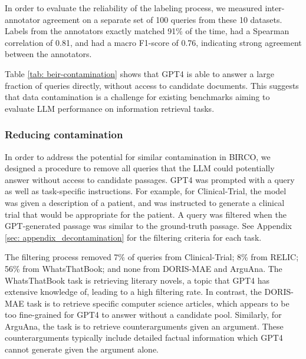 \documentclass[11pt]{article}
\begin{document}
In order to evaluate the reliability of the labeling process, we measured inter-annotator agreement on a separate set of 100 queries from these 10 datasets. Labels from the annotators exactly matched 91\% of the time, had a Spearman correlation of 0.81, and had a macro F1-score of 0.76, indicating strong agreement between the annotators.
  

Table \ref{tab: beir-contamination} shows that GPT4 is able to answer a large fraction of queries directly, without access to candidate documents. This suggests that data contamination is a challenge for existing benchmarks aiming to evaluate LLM performance on information retrieval tasks.


\subsubsection{Reducing contamination}

In order to address the potential for similar contamination in BIRCO, we designed a procedure to remove all queries that the LLM could potentially answer without access to candidate passages. GPT4 was prompted with a query as well as task-specific instructions. For example, for Clinical-Trial, the model was given a description of a patient, and was instructed to generate a clinical trial that would be appropriate for the patient. A query was filtered when the GPT-generated passage was similar to the ground-truth passage. See Appendix \ref{sec: appendix_decontamination} for the filtering criteria for each task.


The filtering process removed 7\% of queries from Clinical-Trial; 8\% from RELIC; 56\% from WhatsThatBook; and none from DORIS-MAE and ArguAna. The WhatsThatBook task is retrieving literary novels, a topic that GPT4 has extensive knowledge of, leading to a high filtering rate. In contrast, the DORIS-MAE task is to retrieve specific computer science articles, which appears to be too fine-grained for GPT4 to answer without a candidate pool. Similarly, for ArguAna, the task is to retrieve counterarguments given an argument. These counterarguments typically include detailed factual information which GPT4 cannot generate given the argument alone. 
\end{document}
